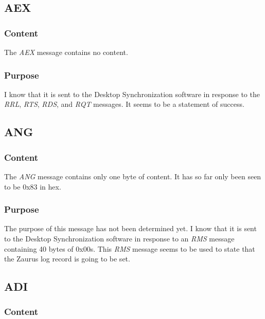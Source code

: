         \subsection{AEX}

            \subsubsection{Content}

            The \emph{AEX} message contains no content.

            \subsubsection{Purpose}

            I know that it is sent to the Desktop Synchronization software in
            response to the \emph{RRL}, \emph{RTS}, \emph{RDS}, and \emph{RQT}
            messages. It seems to be a statement of success.

        \subsection{ANG}

            \subsubsection{Content}

            The \emph{ANG} message contains only one byte of content. It has
            so far only been seen to be 0x83 in hex.

            \subsubsection{Purpose}

            The purpose of this message has not been determined yet. I know
            that it is sent to the Desktop Synchronization software in
            response to an \emph{RMS} message containing 40 bytes of
            0x00s. This \emph{RMS} message seems to be used to state that the
            Zaurus log record is going to be set.

        \subsection{ADI}

            \subsubsection{Content}

